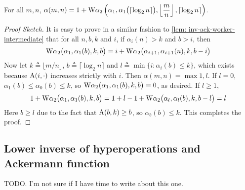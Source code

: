 \begin{thm}
	For all $m, n$, $\displaystyle \alpha(m, n) = 1 + \text{W}\alpha_2\left(\alpha_1, \alpha_1\big(\lceil\log_2n \rceil\big), \left\lfloor \frac{m}{n} \right\rfloor, \lceil\log_2n \rceil \right)$.
\end{thm}
\begin{proof}[Proof Sketch]
	 It is easy to prove in a similar fashion to \cref{lem: inv-ack-worker-intermediate} that for all $n, b, k$ and $i$, if $\alpha_i(n) > k$ and $b > i$, then
	\begin{equation*}
	\text{W}\alpha_2\big(\alpha_1, \alpha_1(b), k, b\big) = i + \text{W}\alpha_2\big(\alpha_{i+1}, \alpha_{i+1}(n), k, b - i\big)
	\end{equation*}
	Now let $k \triangleq \lfloor m/n \rfloor$, $b \triangleq \lceil \log_2n \rceil$ and $l \triangleq \min\big\{i : \alpha_i(b)\le k\big\}$, which exists because $\text{A}(i, \cdot)$ increases strictly with $i$. Then $\alpha(m, n) = \max{1, l}$. If $l = 0$, $\alpha_1(b) \le \alpha_0(b) \le k$, so $\text{W}\alpha_2\big(\alpha_1, \alpha_1(b), k, b\big) = 0$, as desired. If $l \ge 1$,
	\begin{equation*}
	1 + \text{W}\alpha_2\big(\alpha_1, \alpha_1(b), k, b\big)
	= 1 + l - 1 + \text{W}\alpha_2\big(\alpha_l, \alpha_l(b), k, b-l\big) = l
	\end{equation*}
	Here $b\ge l$ due to the fact that $\text{A}(b, k)\ge b$, so $\alpha_b(b)\le k$. This completes the proof.
\end{proof}

\subsection{Lower inverse of hyperoperations and Ackermann function}
{\color{red}TODO. I'm not sure if I have time to write about this one.}
